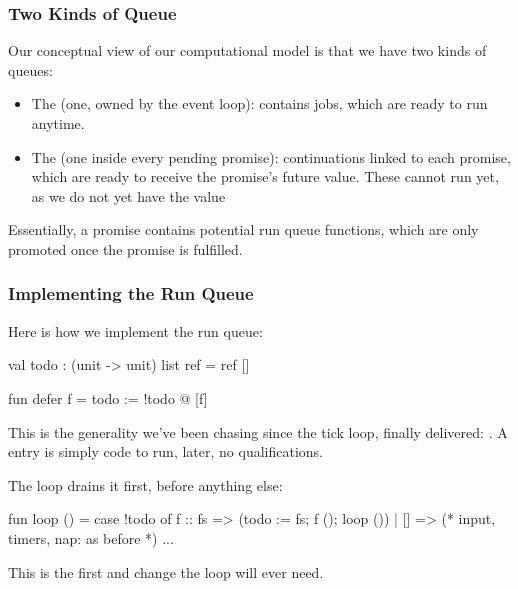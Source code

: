 \documentclass[aspectratio=169]{beamer}
\begin{document}
\begin{frame}[fragile]
  \frametitle{Two Kinds of Queue}

  Our conceptual view of our computational model is that we have
  two kinds of queues:

  \pause
  \vspace{\fill}

  \begin{itemize}
    \item The  (one, owned by the event loop):
      contains jobs, which are ready to run anytime.
    \item The  (one inside every pending promise):
      continuations linked to each promise, which are ready to receive
      the promise's future value. These cannot run yet, as we do not yet have the value
  \end{itemize}

  \pause
  \vspace{\fill}

  Essentially, a promise contains potential run queue functions,
  which are only promoted once the promise is fulfilled.
\end{frame}

\begin{frame}[fragile]
  \frametitle{Implementing the Run Queue}

  Here is how we implement the run queue:

  \begin{codeblock}
    val todo : (unit -> unit) list ref = ref []

    fun defer f = todo := !todo @ [f]
\end{codeblock}

  \pause
  \vspace{\fill}

  This is the generality we've been chasing since the tick loop,
  finally delivered: . A  entry is simply code to run, later, no
  qualifications.

  \pause
  \vspace{\fill}

  The loop drains it first, before anything else:

  \begin{codeblock}
    fun loop () =
      case !todo of
          f :: fs => (todo := fs; f (); loop ())
        | [] => (* input, timers, nap: as before *) ...
\end{codeblock}

  This is the first and  change the loop will ever need.
\end{frame}
\end{document}
